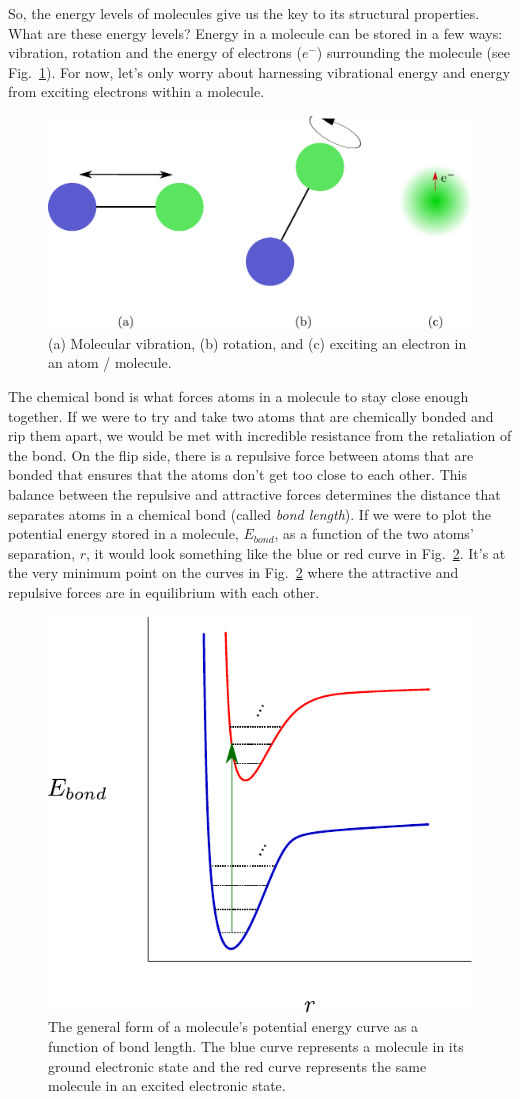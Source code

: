 \documentclass[12pt]{article}
\begin{document}
So, the energy levels of molecules give us the key to its structural properties. What are these energy levels? Energy in a molecule can be stored in a few ways: vibration, rotation and the energy of electrons ($e^-$) surrounding the molecule (see Fig.~\ref{fig:DOFs}). For now, let's only worry about harnessing vibrational energy and energy from exciting electrons within a molecule.

\begin{figure}
    \begin{center}
        \includegraphics[width=0.5\linewidth]{figures/molecule_DOFs.pdf}
    \end{center}
    \caption{
    (a) Molecular vibration, (b) rotation, and (c) exciting an electron in an atom / molecule.
    }
    \label{fig:DOFs}
\end{figure}

The chemical bond is what forces atoms in a molecule to stay close enough together. If we were to try and take two atoms that are chemically bonded and rip them apart, we would be met with incredible resistance from the retaliation of the bond. On the flip side, there is a repulsive force between atoms that are bonded that ensures that the atoms don't get too close to each other. This balance between the repulsive and attractive forces determines the distance that separates atoms in a chemical bond (called \textit{bond length}). If we were to plot the potential energy stored in a molecule, $E_{bond}$, as a function of the two atoms' separation, $r$, it would look something like the blue or red curve in Fig.~\ref{fig:potential_curve}. It's at the very minimum point on the curves in Fig.~\ref{fig:potential_curve} where the attractive and repulsive forces are in equilibrium with each other.

\begin{figure}
    \begin{center}
        \includegraphics[width=0.4\linewidth]{figures/potential_energy_curve.pdf}
    \end{center}
    \caption{
    The general form of a molecule's potential energy curve as a function of bond length. The blue curve represents a molecule in its ground electronic state and the red curve represents the same molecule in an excited electronic state.
    }
    \label{fig:potential_curve}
\end{figure}
\end{document}
